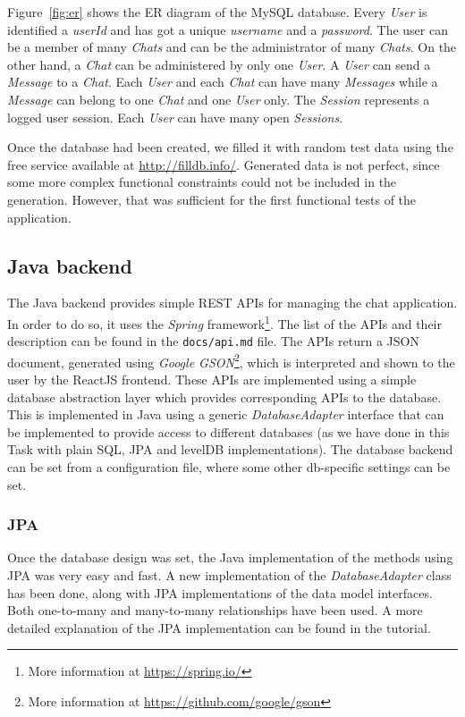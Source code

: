 \documentclass[10pt]{article}
\begin{document}
Figure~\ref{fig:er} shows the ER diagram of the MySQL database. Every \emph{User} 
is identified a \emph{userId} and has got a unique \emph{username} and a 
\emph{password}. The user can be a member of many \emph{Chats} and can 
be the administrator of many \emph{Chats}. On the other hand, a \emph{Chat} 
can be administered by only one \emph{User}. A \emph{User} can send a 
\emph{Message} to a \emph{Chat}. Each \emph{User} and each \emph{Chat} can 
have many \emph{Messages} while a \emph{Message} can belong to one \emph{Chat}
and one \emph{User} only. The \emph{Session} represents a logged user session.
Each \emph{User} can have many open \emph{Sessions}.

Once the database had been created, we filled it with random test data using the free
service available at \url{http://filldb.info/}. Generated data is not perfect, 
since some more complex functional constraints could not be included in the 
generation. However, that was sufficient for the first functional tests of the
application.

\subsection{Java backend}
The Java backend provides simple REST APIs for managing the chat application. 
In order to do so, it uses the \emph{Spring} framework\footnote{More information
at \url{https://spring.io/}}.
The list of the APIs and their description can be found in the 
\texttt{docs/api.md} file. The APIs return a JSON document, generated using
\emph{Google GSON}\footnote{More information at 
\url{https://github.com/google/gson}}, which is interpreted and shown to the user
by the ReactJS frontend.
These APIs are implemented using a simple database abstraction layer which provides 
corresponding APIs to the database. This is implemented in Java 
using a generic \emph{DatabaseAdapter} interface that can be implemented to 
provide access to different databases (as we have done in this Task with plain SQL, 
JPA and levelDB implementations). The database backend can be set from a configuration
file, where some other db-specific settings can be set.

\subsubsection{JPA}
Once the database design was set, the Java implementation of the methods using 
JPA was very easy and fast. A new implementation of the \emph{DatabaseAdapter}
class has been done, along with JPA implementations of the data model interfaces.
Both one-to-many and many-to-many relationships have been used. A more detailed 
explanation of the JPA implementation can be found in the tutorial.
\end{document}
